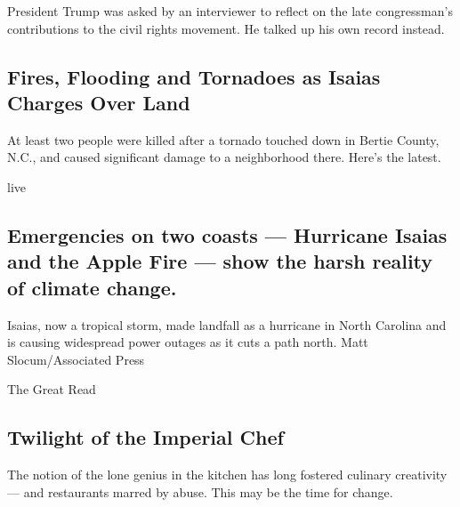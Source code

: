 President Trump was asked by an interviewer to reflect on the late
congressman's contributions to the civil rights movement. He talked up
his own record instead.

\href{/2020/08/04/us/isaias-storm-updates.html}{}

\hypertarget{fires-flooding-and-tornadoes-as-isaias-charges-over-land}{%
\subsection{Fires, Flooding and Tornadoes as Isaias Charges Over
Land}\label{fires-flooding-and-tornadoes-as-isaias-charges-over-land}}

At least two people were killed after a tornado touched down in Bertie
County, N.C., and caused significant damage to a neighborhood there.
Here's the latest.

live

\href{/2020/08/04/climate/hurricane-isaias-apple-fire-climate.html}{}

\hypertarget{emergencies-on-two-coasts--hurricane-isaias-and-the-apple-fire--show-the-harsh-reality-of-climate-change}{%
\subsection{Emergencies on two coasts --- Hurricane Isaias and the Apple
Fire --- show the harsh reality of climate
change.}\label{emergencies-on-two-coasts--hurricane-isaias-and-the-apple-fire--show-the-harsh-reality-of-climate-change}}

Isaias, now a tropical storm, made landfall as a hurricane in North
Carolina and is causing widespread power outages as it cuts a path
north. Matt Slocum/Associated Press

\href{/2020/08/04/dining/chef-restaurant-culture.html}{}

The Great Read

\hypertarget{twilight-of-the-imperial-chef}{%
\subsection{Twilight of the Imperial
Chef}\label{twilight-of-the-imperial-chef}}

The notion of the lone genius in the kitchen has long fostered culinary
creativity --- and restaurants marred by abuse. This may be the time for
change.

\href{/2020/08/04/dining/chef-restaurant-culture.html}{}

